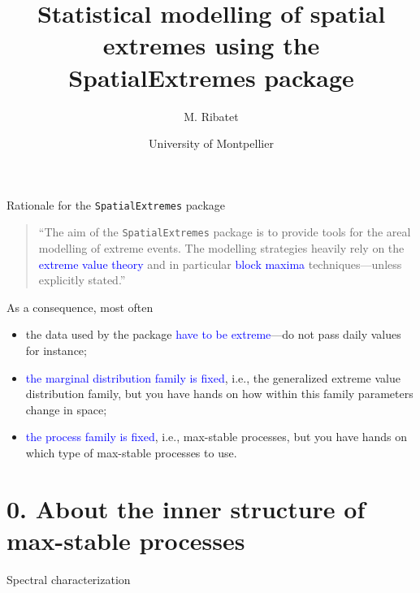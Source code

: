 \documentclass[mode=present,style=simple,paper=screen]{powerdot}
\title{Statistical modelling of spatial extremes using the SpatialExtremes package}
\author{M. Ribatet}
\date{University of Montpellier}
\theoremstyle{plain}%
\theoremstyle{definition}
\theoremstyle{remark}
\begin{document}
\maketitle

\begin{wideslide}[toc=]{Rationale for the \texttt{SpatialExtremes} package}
  \begin{quotation}
    ``The aim of the \texttt{SpatialExtremes} package is to provide
    tools for the areal modelling of extreme events. The modelling
    strategies heavily rely on the \textcolor{blue}{extreme value
      theory} and in particular \textcolor{blue}{block maxima}
    techniques---unless explicitly stated.''
  \end{quotation}

  As a consequence, most often
  \begin{itemize}
  \item the data used by the package \textcolor{blue}{have to be
      extreme}---do not pass daily values for instance;
  \item \textcolor{blue}{the marginal distribution family is fixed},
    i.e., the generalized extreme value distribution family, but you
    have hands on how within this family parameters change in space;
  \item \textcolor{blue}{the process family is fixed}, i.e.,
    max-stable processes, but you have hands on which type of
    max-stable processes to use.
  \end{itemize}
\end{wideslide}

\section[toc=0. Max-stable process]{0. About the inner structure of max-stable processes}

\begin{slide}{Spectral characterization}
  \vspace*{-1.75em}
\end{slide}
\end{document}
